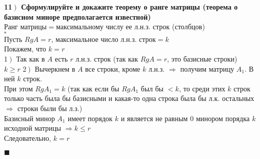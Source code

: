 \documentclass[a4paper,12pt]{article}
\begin{document}
    \textbf{11$\left.\right)$ Сформулируйте и докажите теорему о ранге матрицы (теорема о базисном миноре предполагается известной)}\\
    Ранг матрицы$=$максимальному числу ее л.н.з. строк (столбцов)\\
    $\square$\\
    Пусть $RgA=r$, максимальное число л.н.з. строк$=k$\\
    Покажем, что $k=r$\\
    1$\left.\right)$ Так как в $A$ есть $r$ л.н.з. строк (так как $RgA=r$, это базисные строки)\\
    $k\geq r$
    2$\left.\right)$ Вычеркнем в $A$ все строки, кроме $k$ л.н.з. $\Rightarrow$ получим матрицу $A_1$. В ней $k$ строк.\\
    При этом $RgA_1=k$ (так как если бы $RgA_1$ был бы $<k$, то среди этих $k$ строк только часть была бы базисными и какая-то одна строка была бы л.к. остальных $\Rightarrow$ строки были бы л.з.)\\
    Базисный минор $A_1$ имеет порядок $k$ и является не равным 0 минором порядка $k$ исходной матрицы $\Rightarrow k\leq r$\\
    Следовательно, $k=r$
    \begin{flushright}
        $\blacksquare$
    \end{flushright}\newpage
\end{document}
